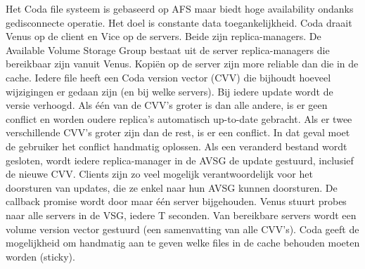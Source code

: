 \documentclass[../samenvatting.tex]{subfiles}
\begin{document}
Het Coda file systeem is gebaseerd op AFS maar biedt hoge availability ondanks gedisconnecte operatie. Het doel is constante data toegankelijkheid. Coda draait Venus op de client en Vice op de servers. Beide zijn replica-managers. De Available Volume Storage Group bestaat uit de server replica-managers die bereikbaar zijn vanuit Venus. Kopiën op de server zijn more reliable dan die in de cache. Iedere file heeft een Coda version vector (CVV) die bijhoudt hoeveel wijzigingen er gedaan zijn (en bij welke servers). Bij iedere update wordt de versie verhoogd. Als één van de CVV's groter is dan alle andere, is er geen conflict en worden oudere replica's automatisch up-to-date gebracht. Als er twee verschillende CVV's groter zijn dan de rest, is er een conflict. In dat geval moet de gebruiker het conflict handmatig oplossen. Als een veranderd bestand wordt gesloten, wordt iedere replica-manager in de AVSG de update gestuurd, inclusief de nieuwe CVV. Clients zijn zo veel mogelijk verantwoordelijk voor het doorsturen van updates, die ze enkel naar hun AVSG kunnen doorsturen. De callback promise wordt door maar één server bijgehouden. Venus stuurt probes naar alle servers in de VSG, iedere T seconden. Van bereikbare servers wordt een volume version vector gestuurd (een samenvatting van alle CVV's). Coda geeft de mogelijkheid om handmatig aan te geven welke files in de cache behouden moeten worden (sticky). 
\end{document}

